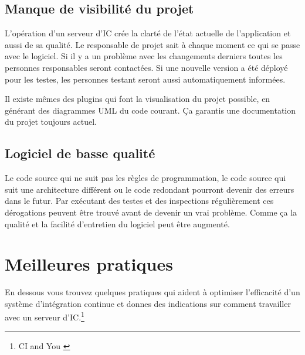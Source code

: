 \subsection{Manque de visibilité du projet}
L'opération d'un serveur d'IC crée la clarté de l'état actuelle de l'application et aussi de sa qualité. Le responsable de projet sait à chaque moment ce qui se passe avec le logiciel. Si il y a un problème avec les changements derniers toutes les personnes responsables seront contactées. Si une nouvelle version a été déployé pour les testes, les personnes testant seront aussi automatiquement informées. 

Il existe mêmes des plugins qui font la visualisation du projet possible, en générant des diagrammes UML du code courant. Ça garantis une documentation du projet toujours actuel.

\subsection{Logiciel de basse qualité}
Le code source qui ne suit pas les règles de programmation, le code source qui suit une architecture différent ou le code redondant pourront devenir des erreurs dans le futur.
Par exécutant des testes et des inspections régulièrement ces dérogations peuvent être trouvé avant de devenir un vrai problème. Comme ça la qualité et la facilité d'entretien du logiciel peut être augmenté.
\clearpage

\section{Meilleures pratiques}
\label{sec:meuilleurespratiques}

En dessous vous trouvez quelques pratiques qui aident à optimiser l'efficacité d'un système d'intégration continue et donnes des indications sur comment travailler avec un serveur d'IC.\footnote{CI and You \cite[p~47]{duvallconint}}

